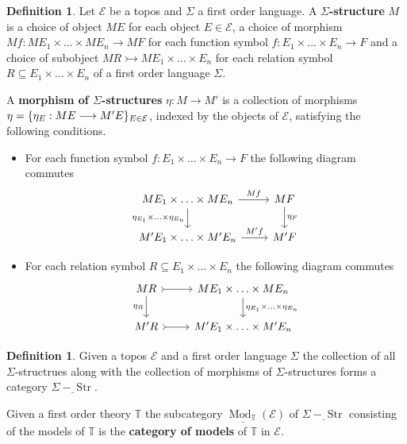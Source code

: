 \documentclass[12pt]{article}
\theoremstyle{plain}
\theoremstyle{definition}
\newtheorem{defn}[thm]{Definition} %
\newcommand{\bb}[1]{\mathbb{#1}}
\newcommand{\call}[1]{\mathcal{#1}}
\newcommand{\lto}{\longrightarrow}
\begin{document}
	\begin{defn}
		Let $\call{E}$ be a topos and $\Sigma$ a first order language. A \textbf{$\Sigma$-structure} $M$ is a choice of object $ME$ for each object $E \in \call{E}$, a choice of morphism $Mf: ME_1 \times \ldots \times ME_n \lto MF$ for each function symbol $f: E_1 \times \ldots \times E_n \lto F$ and a choice of subobject $MR \rightarrowtail ME_1 \times \ldots \times E_n$ for each relation symbol $R \subseteq E_1 \times \ldots \times E_n$ of a first order language $\Sigma$.
		
		A \textbf{morphism of $\Sigma$-structures} $\eta: M \lto M'$ is a collection of morphisms $\eta = \{ \eta_E: ME \lto M'E \}_{E \in \cal{E}}$, indexed by the objects of $\call{E}$, satisfying the following conditions.
		\begin{itemize}
			\item For each function symbol $f: E_1 \times \ldots \times E_n \lto F$ the following diagram commutes
			\begin{equation}
				\begin{tikzcd}
					ME_1 \times \ldots \times ME_n\arrow[r,"{Mf}"]\arrow[d,swap,"{\eta_{E_1} \times \ldots \times \eta_{E_n}}"] & MF\arrow[d,"{\eta_F}"]\\
					M'E_1 \times \ldots \times M'E_n\arrow[r,"{M'f}"] & M'F
					\end{tikzcd}
				\end{equation}
			\item For each relation symbol $R \subseteq E_1 \times \ldots \times E_n$ the following diagram commutes
			\begin{equation}
				\begin{tikzcd}
					MR\arrow[r,rightarrowtail]\arrow[d,swap,"{\eta_R}"] & ME_1 \times \ldots \times ME_n\arrow[d,"{\eta_{E_1} \times \ldots \times \eta_{E_n}}"]\\
					M'R\arrow[r,rightarrowtail] & M'E_1 \times \ldots \times M'E_n
					\end{tikzcd}
				\end{equation}
			\end{itemize}
		\end{defn}
	
	\begin{defn}
		Given a topos $\call{E}$ and a first order language $\Sigma$ the collection of all $\Sigma$-structrues along with the collection of morphisms of $\Sigma$-structures forms a category $\underline{\Sigma-\operatorname{Str}}$.
		
		Given a first order theory $\bb{T}$ the subcategory $\underline{\operatorname{Mod}_{\bb{T}}}(\call{E})$ of $\underline{\Sigma-\operatorname{Str}}$ consisting of the models of $\bb{T}$ is the \textbf{category of models} of $\bb{T}$ in $\call{E}$.
		\end{defn}
	
\end{document}
